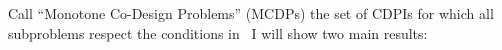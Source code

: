 Call ``Monotone Co-Design Problems'' (MCDPs) the set of CDPIs for which all subproblems respect the conditions in~\XXX
I will show two main results:


%
%
%

